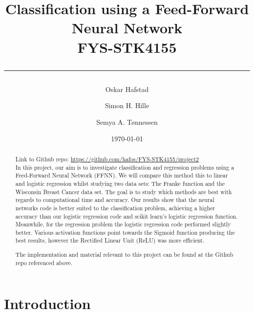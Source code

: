 \documentclass[english,notitlepage,reprint,nofootinbib]{revtex4-2}  %
\begin{document}

\title{\vspace*{-2cm}\bf Classification using a Feed-Forward Neural Network \hspace*{5cm}\\
FYS-STK4155\\
\rule{\textwidth}{0.05cm}}
\author[1]{Oskar Hafstad}
\author[3]{Simon H. Hille}
\author[1, 2]{Semya A. Tønnessen}
\date{\today}
\begin{abstract} \centering Link to Github repo: \url{https://github.com/hafos/FYS-STK4155/project2}%
\vspace{3mm}
\\
In this project, our aim is to investigate classification and regression problems using a Feed-Forward Neural Network (FFNN). We will compare this method this to linear and logistic regression whilst studying two data sets: The Franke function and the Wisconsin Breast Cancer data set. 
The goal is to study which methods are best with regards to computational time and accuracy. 
Our results show that the neural networks code is better suited to the classification problem, achieving a higher accuracy than our logistic regression code and scikit learn's logistic regression function. Meanwhile, for the regression problem the logistic regression code performed slightly better. Various activation functions point towards the Sigmoid function producing the best results, however the Rectified Linear Unit (ReLU) was more efficient. 

The implementation and material relevant to this project can be found at the Github repo referenced above. 
\end{abstract}
\maketitle

\section{Introduction} 
\end{document}
